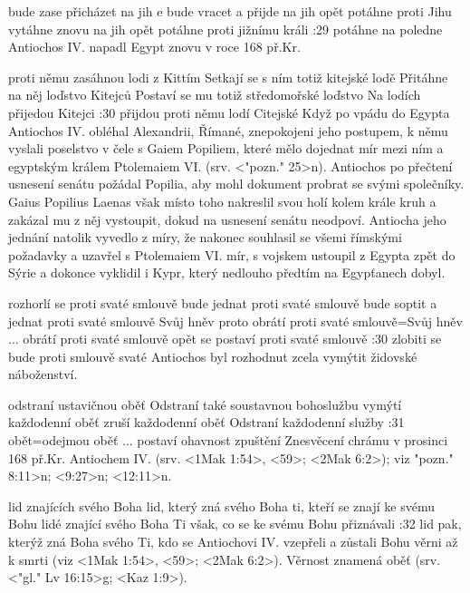     {bude zase přicházet na jih}   %
    {e bude vracet a přijde na jih}   %
    {opět potáhne proti Jihu}   %
    {vytáhne znovu na jih}  %
    {opět potáhne proti jižnímu králi}   %
:29 {potáhne na poledne}
    Antiochos IV. napadl Egypt znovu v roce 168 př.Kr.
    
    {proti němu zasáhnou lodi z Kittím}   %
    {Setkají se s ním totiž kitejské lodě}  %
    {Přitáhne na něj loďstvo Kitejců}   %
    {Postaví se mu totiž středomořské loďstvo}   %
    {Na lodích přijedou Kitejci}   %
:30 {přijdou proti němu lodí Citejské}
    Když po vpádu do Egypta Antiochos IV. obléhal Alexandrii,   Římané, znepokojeni jeho postupem, k němu vyslali poselstvo v čele s Gaiem Popiliem, které mělo dojednat mír mezi ním a egyptským králem Ptolemaiem VI. (srv. <"pozn." 25>n). Antiochos po přečtení usnesení senátu požádal Popilia, aby mohl dokument probrat se svými společníky. Gaius Popilius Laenas však místo toho nakreslil svou holí kolem krále kruh a zakázal mu z něj vystoupit, dokud na usnesení senátu neodpoví. Antiocha jeho jednání natolik vyvedlo z míry, že nakonec souhlasil se všemi římskými požadavky a uzavřel s Ptolemaiem VI. mír, s vojskem ustoupil z Egypta zpět do Sýrie a dokonce vyklidil i Kypr, který nedlouho předtím na Egypťanech dobyl.
    
    {rozhorlí se proti svaté smlouvě}   %
    {bude jednat proti svaté smlouvě}   %
    {bude soptit a jednat proti svaté smlouvě}   %
    {Svůj hněv proto obrátí proti svaté smlouvě}={Svůj hněv ... obrátí proti svaté smlouvě}   %
    {opět se postaví proti svaté smlouvě}  %
:30 {zlobiti se bude proti smlouvě svaté}
    Antiochos byl rozhodnut zcela vymýtit židovské náboženství.
    
    

   {odstraní ustavičnou oběť}   %
   {Odstraní také soustavnou bohoslužbu}   %
   {vymýtí každodenní oběť}   %
   {zruší každodenní oběť}   %
   {Odstraní každodenní služby}   %
:31 {obět}={odejmou oběť ... postaví ohavnost zpuštění} 
Znesvěcení chrámu v prosinci 168 př.Kr. Antiochem IV. (srv. <1Mak 1:54>, <59>; <2Mak 6:2>); viz \<"pozn." 8:11>n; <9:27>n; <12:11>n.


    
    {lid znajících svého Boha}   %
    {lid, který zná svého Boha}   %
    {ti, kteří se znají ke svému Bohu}   %
    {lidé znající svého Boha}   %
    {Ti však, co se ke svému Bohu přiznávali}   %
:32 {lid pak, kterýž zná Boha svého}
    Ti, kdo se Antiochovi IV. vzepřeli a zůstali Bohu věrni až k smrti (viz <1Mak 1:54>, <59>; <2Mak 6:2>). Věrnost znamená oběť (srv. 
    <"gl." Lv 16:15>g; <Kaz 1:9>).


